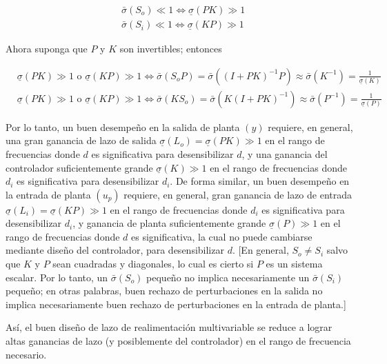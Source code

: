 $$
\begin{aligned}
& \bar{\sigma}\left(S_{o}\right) \ll 1 \Longleftrightarrow \underline{\sigma}(P K) \gg 1 \\
& \bar{\sigma}\left(S_{i}\right) \ll 1 \Longleftrightarrow \underline{\sigma}(K P) \gg 1
\end{aligned}
$$

Ahora suponga que $P$ y $K$ son invertibles; entonces

$$
\begin{aligned}
& \underline{\sigma}(P K) \gg 1 \text { o } \underline{\sigma}(K P) \gg 1 \Longleftrightarrow \bar{\sigma}\left(S_{o} P\right)=\bar{\sigma}\left((I+P K)^{-1} P\right) \approx \bar{\sigma}\left(K^{-1}\right)=\frac{1}{\underline{\sigma}(K)} \\
& \underline{\sigma}(P K) \gg 1 \text { o } \underline{\sigma}(K P) \gg 1 \Longleftrightarrow \bar{\sigma}\left(K S_{o}\right)=\bar{\sigma}\left(K(I+P K)^{-1}\right) \approx \bar{\sigma}\left(P^{-1}\right)=\frac{1}{\underline{\sigma}(P)}
\end{aligned}
$$

Por lo tanto, un buen desempeño en la salida de planta $(y)$ requiere, en general, una gran ganancia de lazo de salida $\underline{\sigma}\left(L_{o}\right)=\underline{\sigma}(P K) \gg 1$ en el rango de frecuencias donde $d$ es significativa para desensibilizar $d$, y una ganancia del controlador suficientemente grande $\underline{\sigma}(K) \gg 1$ en el rango de frecuencias donde $d_{i}$ es significativa para desensibilizar $d_{i}$. De forma similar, un buen desempeño en la entrada de planta $\left(u_{p}\right)$ requiere, en general, gran ganancia de lazo de entrada $\underline{\sigma}\left(L_{i}\right)=\underline{\sigma}(K P) \gg 1$ en el rango de frecuencias donde $d_{i}$ es significativa para desensibilizar $d_{i}$, y ganancia de planta suficientemente grande $\underline{\sigma}(P) \gg 1$ en el rango de frecuencias donde $d$ es significativa, la cual no puede cambiarse mediante diseño del controlador, para desensibilizar $d$. [En general, $S_{o} \neq S_{i}$ salvo que $K$ y $P$ sean cuadradas y diagonales, lo cual es cierto si $P$ es un sistema escalar. Por lo tanto, un $\bar{\sigma}\left(S_{o}\right)$ pequeño no implica necesariamente un $\bar{\sigma}\left(S_{i}\right)$ pequeño; en otras palabras, buen rechazo de perturbaciones en la salida no implica necesariamente buen rechazo de perturbaciones en la entrada de planta.]

Así, el buen diseño de lazo de realimentación multivariable se reduce a lograr altas ganancias de lazo (y posiblemente del controlador) en el rango de frecuencia necesario.


